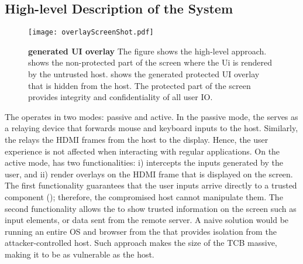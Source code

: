 \subsection{High-level Description of the System}

\begin{figure}[t]
\centering
\texttt{[image: overlayScreenShot.pdf]}
\caption{\textbf{\device generated UI overlay} The figure shows the \name high-level approach. \one shows the non-protected part of the screen where the Ui is rendered by the untrusted host. \two shows the \device generated protected UI overlay that is hidden from the host. The protected part of the screen provides integrity and confidentiality of all user IO.}
\label{fig:screenshot_1}
\end{figure}


The \device operates in two modes: passive and active. In the passive mode, the \device serves as a relaying device that forwards mouse and keyboard inputs to the host. Similarly, the \device relays the HDMI frames from the host to the display. Hence, the user experience is not affected when interacting with regular applications. On the active mode, \device has two functionalities: i) intercepts the inputs generated by the user, and ii) render overlays on the HDMI frame that is displayed on the screen. 
The first functionality guarantees that the user inputs arrive directly to a trusted component (\device); therefore, the compromised host cannot manipulate them. The second functionality allows the \device to show trusted information on the screen such as input elements, or data sent from the remote server. A naive solution would be running an entire OS and browser from the \device that provides isolation from the attacker-controlled host. Such approach makes the size of the \device TCB massive, making it to be as vulnerable as the host. 

